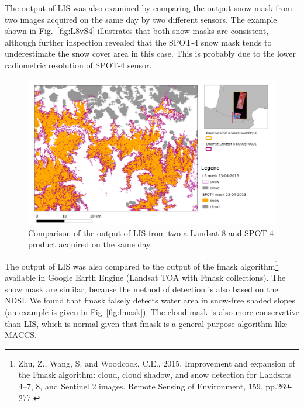\documentclass[a4paper]{article}
\begin{document}
The output of LIS was also examined by comparing the output snow mask from two images acquired on the same day by two different sensors. The example shown in Fig.~\ref{fig:L8vS4} illustrates that both snow masks are consistent, although further inspection revealed that the SPOT-4 snow mask tends to underestimate the snow cover area in this case. This is probably due to the lower radiometric resolution of SPOT-4 sensor.

\begin{figure}[h]
 \centering
 \includegraphics[width=\textwidth]{./images/L8vsS4-23042013_montage.png}
 \caption{Comparison of the output of LIS from two a Landsat-8 and SPOT-4 product acquired on the same day.}
 \label{fig:L8vsS4-23042013}
\end{figure}

The output of LIS was also compared to the output of the fmask algorithm\footnote{Zhu, Z., Wang, S. and Woodcock, C.E., 2015. Improvement and expansion of the Fmask algorithm: cloud, cloud shadow, and snow detection for Landsats 4–7, 8, and Sentinel 2 images. Remote Sensing of Environment, 159, pp.269-277.} available in Google Earth Engine (Landsat TOA with Fmask collections). The snow mask are similar, because the method of detection is also based on the NDSI. We found that fmask falsely detects water area in snow-free shaded slopes (an example is given in Fig~\ref{fig:fmask}). The cloud mask is also more conservative than LIS, which is normal given that fmask is a general-purpose algorithm like MACCS. 
\end{document}
